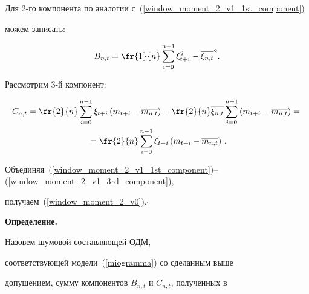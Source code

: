     Для 2-го компонента по аналогии с~(\ref{window_moment_2_v1_1st_component})


    можем     записать:


    \begin{equation}


        \label{window_moment_2_v1_2nd_component}


            B_{n,t} = \fr{1}{n}\sum\limits^{n-1}_{i=0}\xi^2_{t+i} -


            \overline{\xi_{n,t}}^2.


    \end{equation}





    Рассмотрим 3-й компонент:


    \begin{multline}


        \label{window_moment_2_v1_3rd_component}


           C_{n,t} = \fr{2}{n}\sum\limits^{n-1}_{i=0}\xi_{t+i}\left(m_{t+i} -


           \overline{m_{n,t}}\right) -


           \fr{2}{n}\overline{\xi_{n,t}}\sum\limits^{n-1}_{i=0}\left(m_{t+i} -


           \overline{m_{n,t}}\right) ={} \\


           {}= \fr{2}{n}\sum\limits^{n-1}_{i=0}\xi_{t+i}\left(m_{t+i} -


           \overline{m_{n,t}}\right)\,.


    \end{multline}





    Объединяя~(\ref{window_moment_2_v1_1st_component})--(\ref{window_moment_2_v1_3rd_component}),


    получаем~(\ref{window_moment_2_v0}).\hfill$\square$





\smallskip





\noindent


\textbf{Определение.}


Назовем шумовой составляющей ОДМ,


соответствующей модели~(\ref{miogramma}) со сделанным выше


допущением, сумму компонентов $B_{n,t}$ и $C_{n,t}$, полученных в


